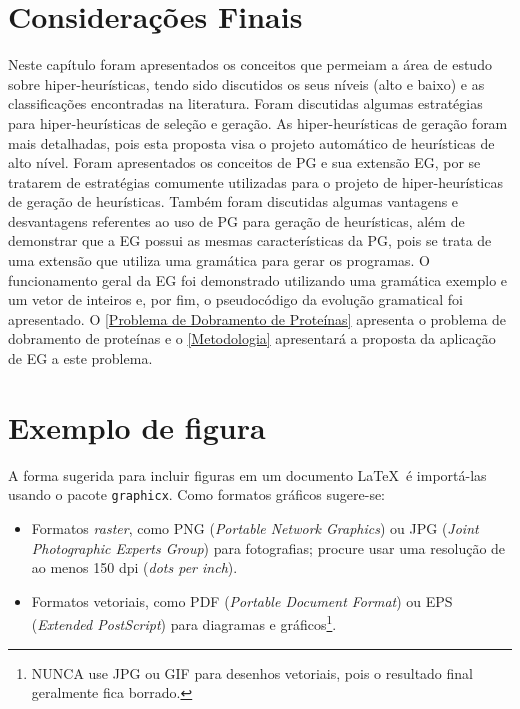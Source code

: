\section{Considerações Finais}
\label{ReferencialTeorico:ConsideracoesFinais}


Neste capítulo foram apresentados os conceitos que permeiam a área de estudo sobre hiper-heurísticas, tendo sido discutidos os seus níveis (alto e baixo) e as classificações encontradas na literatura.  Foram discutidas algumas estratégias para hiper-heurísticas de seleção e geração. As hiper-heurísticas de geração foram mais detalhadas, pois esta proposta visa o projeto  automático de heurísticas de alto nível. Foram apresentados os conceitos de PG e sua extensão EG, por se tratarem de estratégias comumente utilizadas para o projeto de hiper-heurísticas de geração de heurísticas. Também foram discutidas algumas vantagens e desvantagens referentes ao uso de PG para geração de heurísticas, além de demonstrar que a EG possui as mesmas características da PG, pois se trata de uma extensão que utiliza uma gramática para gerar os programas. O funcionamento geral da EG foi demonstrado utilizando uma gramática exemplo e um vetor de inteiros e, por fim, o pseudocódigo da evolução gramatical foi apresentado. O  \autoref{Problema de Dobramento de Proteínas} apresenta o problema de dobramento de proteínas e o \autoref{Metodologia} apresentará a proposta da aplicação de EG a este problema.






\section{Exemplo de figura}

A forma sugerida para incluir figuras em um documento \LaTeX\ é importá-las usando o pacote \texttt{graphicx}. Como formatos gráficos sugere-se:

\begin{itemize}

\item Formatos \emph{raster}, como PNG (\emph{Portable Network Graphics}) ou JPG (\emph{Joint Photographic Experts Group}) para fotografias; procure usar uma resolução de ao menos 150 dpi (\emph{dots per inch}).

\item Formatos vetoriais, como PDF (\emph{Portable Document Format}) ou EPS (\emph{Extended PostScript}) para diagramas e gráficos\footnote{NUNCA use JPG ou GIF para desenhos vetoriais, pois o resultado final geralmente fica borrado.}.

\end{itemize}

